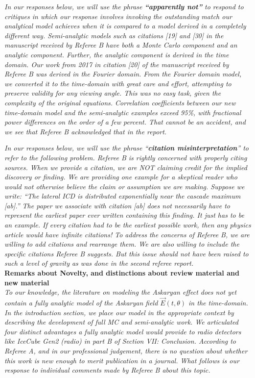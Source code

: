 \documentclass[12pt]{article}
\begin{document}
\textit{In our responses below, we will use the phrase \textbf{``apparently not''} to respond to critiques in which our response involves invoking the outstanding match our analytical model achieves when it is compared to a model derived in a completely different way.  Semi-analytic models such as citations [19] and [30] in the manuscript received by Referee B have both a Monte Carlo component and an analytic component.  Further, the analytic component is derived in the time domain.  Our work from 2017 in citation [20] of the manuscript received by Referee B was derived in the Fourier domain.  From the Fourier domain model, we converted it to the time-domain with great care and effort, attempting to preserve validity for any viewing angle.  This was no easy task, given the complexity of the original equations.  Correlation coefficients between our new time-domain model and the semi-analytic examples exceed 95\%, with fractional power differences on the order of a few percent.  That cannot be an accident, and we see that Referee B acknowledged that in the report.}

\textit{In our responses below, we will use the phrase ``\textbf{citation misinterpretation}'' to refer to the following problem.  Referee B is rightly concerned with properly citing sources.  When we provide a citation, we are NOT claiming credit for the implied discovery or finding.  We are providing one example for a skeptical reader who would not otherwise believe the claim or assumption we are making.  Suppose we write: ``The lateral ICD is distributed exponentially near the cascade maximum [ab].''  The paper we associate with citation [ab] does not necessarily have to represent the earliest paper ever written containing this finding.  It just has to be an example.  If every citation had to be the earliest possible work, then any physics article would have infinite citations!  To address the concerns of Referee B, we are willing to add citations and rearrange them.  We are also willing to include the specific citations Referee B suggests.  But this issue should not have been raised to such a level of gravity as was done in the second referee report.} \\ 

\textbf{Remarks about Novelty, and distinctions about review material and new material} \\

\textit{To our knowledge, the literature on modeling the Askaryan effect does not yet contain a fully analytic model of the Askaryan field $\vec{E}(t,\theta)$ in the time-domain.  In the introduction section, we place our model in the appropriate context by describing the development of full MC and semi-analytic work.  We articulated four distinct advantages a fully analytic model would provide to radio detectors like IceCube Gen2 (radio) in part B of Section VII: Conclusion.  According to Referee A, and in our professional judgement, there is no question about whether this work is new enough to merit publication in a journal.  What follows is our response to individual comments made by Referee B about this topic.}
\end{document}
